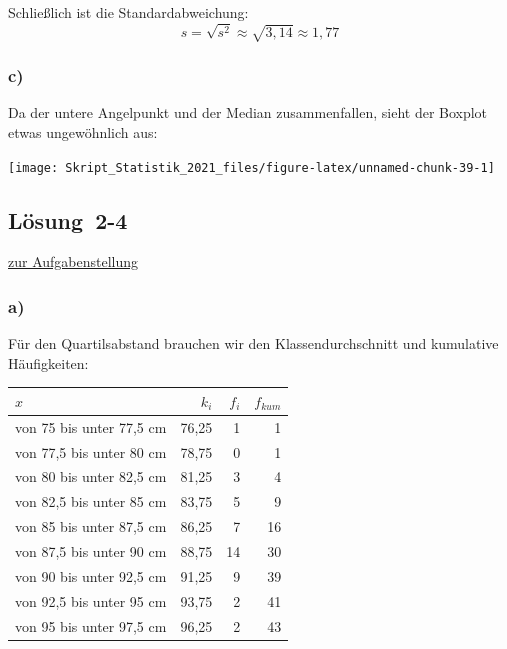 \documentclass[
  11pt,
  ngerman,
  a4paper,
]{report}
\begin{document}
Schließlich ist die Standardabweichung: \[s=\sqrt{s^2}\approx\sqrt{3,14}\approx1,77\]

\hypertarget{c-4}{%
\subsubsection{c)}\label{c-4}}

Da der untere Angelpunkt und der Median zusammenfallen, sieht der Boxplot etwas ungewöhnlich aus:

\begin{center}\texttt{[image: Skript\_Statistik\_2021\_files/figure-latex/unnamed-chunk-39-1]} \end{center}

\hypertarget{loesung-2-4}{%
\subsection{Lösung~2-4}\label{loesung-2-4}}

\protect\hyperlink{aufgabe-2-4}{zur Aufgabenstellung}

\hypertarget{a-5}{%
\subsubsection{a)}\label{a-5}}

Für den Quartilsabstand brauchen wir den Klassendurchschnitt und kumulative Häufigkeiten:

\begin{table}[H]
\centering
\begin{tabular}{lrrr}
\toprule
$x$ & $k_i$ & $f_i$ & $f_{kum}$\\
\midrule
von 75 bis unter 77,5 cm & 76,25 & 1 & 1\\
von 77,5 bis unter 80 cm & 78,75 & 0 & 1\\
von 80 bis unter 82,5 cm & 81,25 & 3 & 4\\
von 82,5 bis unter 85 cm & 83,75 & 5 & 9\\
von 85 bis unter 87,5 cm & 86,25 & 7 & 16\\
von 87,5 bis unter 90 cm & 88,75 & 14 & 30\\
von 90 bis unter 92,5 cm & 91,25 & 9 & 39\\
von 92,5 bis unter 95 cm & 93,75 & 2 & 41\\
von 95 bis unter 97,5 cm & 96,25 & 2 & 43\\
\bottomrule
\end{tabular}
\end{table}
\end{document}

